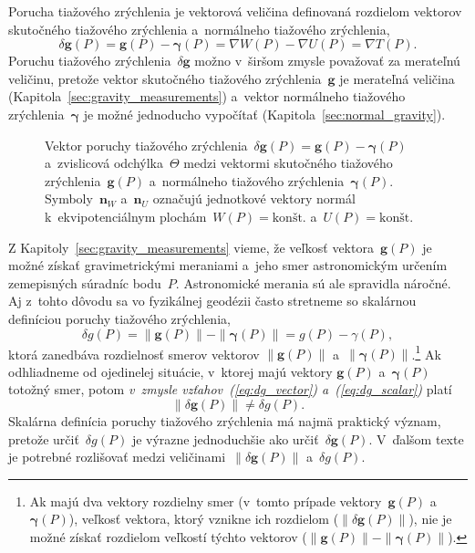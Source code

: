 \documentclass[a4paper,12pt]{book}
\let\vec\mathbf
\begin{document}
Porucha tiažového zrýchlenia je vektorová veličina definovaná rozdielom 
vektorov skutočného tiažového zrýchlenia a~normálneho tiažového zrýchlenia,
%
\begin{equation}
\label{eq:dg_vector}
\delta \vec g(P) = \vec g(P) - \boldsymbol \gamma(P) = \nabla W(P) - \nabla 
U(P) = \nabla T(P){.}
\end{equation}
%
Poruchu tiažového zrýchlenia~$\delta \vec g$ možno v~širšom zmysle považovať za 
merateľnú veličinu, pretože vektor skutočného tiažového zrýchlenia~$\vec g$ je 
merateľná veličina (Kapitola~\ref{sec:gravity_measurements}) a~vektor 
normálneho tiažového zrýchlenia~$\boldsymbol\gamma$ je možné jednoducho 
vypočítať (Kapitola~\ref{sec:normal_gravity}).

\begin{figure}[bt]
\centering

\caption{Vektor poruchy tiažového zrýchlenia~$\delta \vec g(P) = \vec g(P) 
- \boldsymbol\gamma(P)$ a~zvislicová odchýlka~$\Theta$ medzi vektormi 
skutočného tiažového zrýchlenia~$\vec g(P)$ a~normálneho tiažového 
zrýchlenia~$\boldsymbol\gamma(P)$.  Symboly~$\vec n_W$ a~$\vec n_U$ označujú 
jednotkové vektory normál k~ekvipotenciálnym plochám~$W(P) 
= \textrm{kon\v{s}t.}$ a~$U(P) = \textrm{kon\v{s}t.}$}
\label{fig:gravity_disturbance}
\end{figure}

Z Kapitoly~\ref{sec:gravity_measurements} vieme, že veľkosť vektora~$\vec g(P)$ 
je možné získať gravimetrickými meraniami a~jeho smer astronomickým určením 
zemepisných súradníc bodu~$P$.  Astronomické merania sú ale spravidla náročné.  
Aj z~tohto dôvodu sa vo fyzikálnej geodézii často stretneme so skalárnou 
definíciou poruchy tiažového zrýchlenia,
%
\begin{equation}
\label{eq:dg_scalar}
\delta g(P) = \| \vec g(P) \| - \| \boldsymbol \gamma(P) \| = g(P) 
- \gamma(P){,}
\end{equation}
%
ktorá zanedbáva rozdielnosť smerov vektorov $\| \vec g(P) \|$ a~$\| \boldsymbol 
\gamma(P) \|$.\footnote{Ak majú dva vektory rozdielny smer (v~tomto prípade 
vektory~$\vec g(P)$ a~$\boldsymbol \gamma(P)$), veľkosť vektora, ktorý vznikne 
ich rozdielom ($\| \delta \vec g(P) \|$), nie je možné získať rozdielom 
veľkostí týchto vektorov ($\| \vec g(P) \| - \| \boldsymbol \gamma(P) \|$).}  
Ak odhliadneme od ojedinelej situácie, v~ktorej majú vektory $\vec g(P)$ 
a~$\boldsymbol{\gamma}(P)$ totožný smer, potom \emph{v~zmysle 
vzťahov~(\ref{eq:dg_vector}) a~(\ref{eq:dg_scalar})} platí
%
\begin{equation}
\| \delta \vec g(P) \| \neq \delta g(P){.}
\end{equation}
%
Skalárna definícia poruchy tiažového zrýchlenia má najmä praktický význam, 
pretože určiť~$\delta g(P)$ je výrazne jednoduchšie ako určiť~$\delta \vec 
g(P)$.  V~ďalšom texte je potrebné rozlišovať medzi veličinami~$\| \delta \vec 
g(P) \|$ a~$\delta g(P)$.
\end{document}
